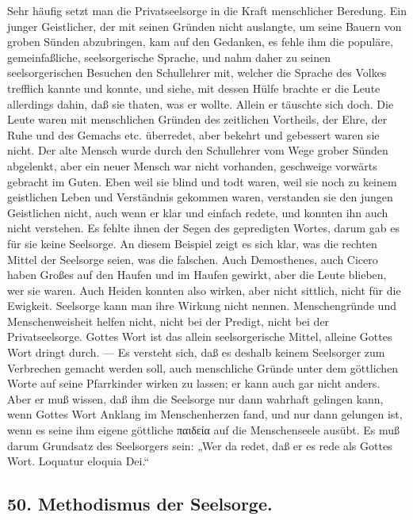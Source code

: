 Sehr häufig setzt man die Privatseelsorge in die Kraft menschlicher Beredung. Ein junger Geistlicher, der mit seinen Gründen nicht auslangte, um seine Bauern von groben Sünden abzubringen, kam auf den Gedanken, es fehle ihm die populäre, gemeinfaßliche, seelsorgerische Sprache, und nahm daher zu seinen seelsorgerischen Besuchen den Schullehrer mit, welcher die Sprache des Volkes trefflich kannte und konnte, und siehe, mit dessen Hülfe brachte er die Leute allerdings dahin, daß sie thaten, was er wollte. Allein er täuschte sich doch. Die Leute waren mit menschlichen Gründen des zeitlichen Vortheils, der Ehre, der Ruhe und des Gemachs etc. überredet, aber bekehrt und gebessert waren sie nicht. Der alte Mensch wurde durch den Schullehrer vom Wege grober
Sünden abgelenkt, aber ein neuer Mensch war nicht vorhanden, geschweige vorwärts gebracht im Guten. Eben weil sie blind und todt waren, weil sie noch zu keinem geistlichen Leben und Verständnis gekommen waren, verstanden sie den jungen Geistlichen nicht, auch wenn er klar und einfach redete, und konnten ihn auch nicht verstehen. Es fehlte ihnen der Segen des gepredigten Wortes, darum gab es für sie keine Seelsorge. An diesem Beispiel zeigt es sich klar, was die rechten Mittel der Seelsorge seien, was die falschen. Auch Demosthenes, auch Cicero haben Großes auf den Haufen und im Haufen gewirkt, aber die Leute blieben, wer sie waren. Auch Heiden konnten also wirken, aber nicht sittlich, nicht für die Ewigkeit. Seelsorge kann man ihre Wirkung nicht nennen. Menschengründe und Menschenweisheit helfen nicht, nicht bei der Predigt, nicht bei der Privatseelsorge. Gottes Wort ist das allein seelsorgerische Mittel, alleine Gottes Wort dringt durch. — Es versteht sich, daß es deshalb keinem Seelsorger zum Verbrechen gemacht werden soll, auch menschliche Gründe unter dem göttlichen Worte auf seine Pfarrkinder wirken zu lassen; er kann auch gar nicht anders. Aber er muß wissen, daß ihm die Seelsorge nur dann wahrhaft gelingen kann, wenn Gottes Wort Anklang im Menschenherzen fand, und nur dann gelungen ist, wenn es seine ihm eigene göttliche παιδεία auf die Menschenseele ausübt. Es muß darum Grundsatz des Seelsorgers sein: „Wer da redet, daß er es rede als Gottes Wort. Loquatur eloquia Dei.“

\subsection*{50. Methodismus der Seelsorge.}

